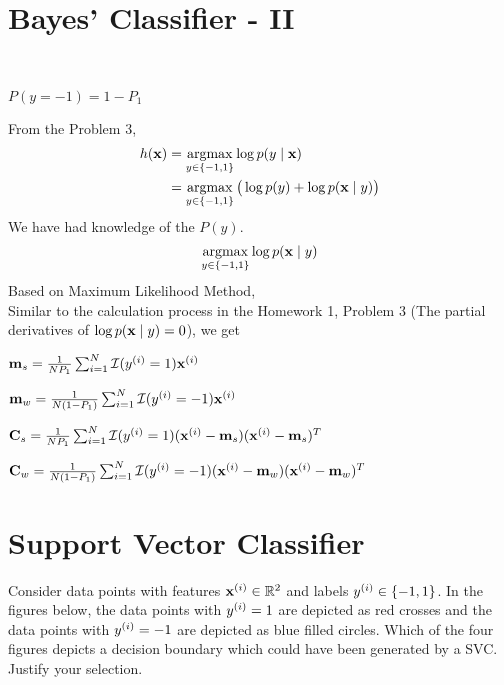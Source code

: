 \documentclass[article,11pt]{article}
\begin{document}
\section{Bayes' Classifier - II}
\\
\begin{center}
	$P(y=-1)=1-P_{1}$
\end{center}
From the Problem 3, 
\begin{equation}
\begin{aligned}
h({\bf x})&=\operatorname*{argmax}_{y \in \{-1,1\}}\log p(y \mid {\bf x}) \\
&= \operatorname*{argmax}_{y \in \{-1,1\}}\big (\log p(y)+ \log p({\bf x} \mid y)\big )
\end{aligned}
\end{equation}
We have had knowledge of the $P(y)$.\\
\begin{equation}
\operatorname*{argmax}_{y \in \{-1,1\}}\log p({\bf x} \mid y)  \\
\end{equation}
Based on Maximum Likelihood Method, \\
Similar to the calculation process in the Homework 1, Problem 3 (The partial derivatives of $ \log p({\bf x} \mid y)= 0$), we get
\begin{center}
${\bf m}_{s}=\frac{1}{NP_{1}}\sum^{N}_{i=1}\mathcal{I}(y^{(i)}=1){\bf x}^{(i)}$ 
\end{center}
\begin{center}
	${\bf m}_{w}=\frac{1}{N(1-P_{1})}\sum^{N}_{i=1}\mathcal{I}(y^{(i)}=-1){\bf x}^{(i)} $
\end{center}
\begin{center}
	$\mathbf{C}_{s} =\frac{1}{NP_{1}}\sum^{N}_{i=1}\mathcal{I}(y^{(i)}=1)({\bf x}^{(i)}-{\bf m}_{s})({\bf x}^{(i)}-{\bf m}_{s})^{T}$
\end{center}
\begin{center}
	$\mathbf{C}_{w} =\frac{1}{N(1-P_{1})}\sum^{N}_{i=1}\mathcal{I}(y^{(i)}=-1)({\bf x}^{(i)}-{\bf m}_{w})({\bf x}^{(i)}-{\bf m}_{w})^{T} $
\end{center}



\newpage
\section{Support Vector Classifier}
Consider data points with features ${\bf x}^{(i)} \in \mathbb{R}^{2}$ and labels $y^{(i)} \in \{-1,1\}$. 
In the figures below, the data points with $y^{(i)}=1$ are depicted as red crosses 
and the data points with  $y^{(i)}=-1$ are depicted as blue filled circles. 
Which of the four figures depicts a decision boundary which could have been generated by a SVC. Justify your selection.
	
\end{document}
